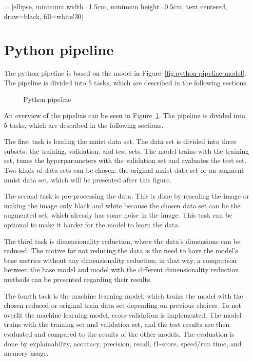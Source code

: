  = [ellipse, minimum width=1.5cm, minimum height=0.5cm, text centered, draw=black, fill=white!30]
\section{Python pipeline}\label{sec:python-pipeline}
The python pipeline is based on the model in Figure~\ref{fig:python-pipeline-model}. The pipeline is divided into 5 tasks, which are described in the following sections. 

\begin{figure}[htb!]
    \centering
    
    \caption{Python pipeline}
    \label{fig:Python-pipeline}
\end{figure}

An overview of the pipeline can be seen in Figure~\ref{fig:Python-pipeline}. The pipeline is divided into 5 tasks, which are described in the following sections. 


The first task is loading the \gls{mnist} data set. The data set is divided into three subsets: the training, validation, and test sets. 
The model trains with the training set, tunes the hyperparameters with the validation set and evaluates the test set. Two kinds of data sets can be chosen: the original \gls{mnist} data set or an augment \gls{mnist} data set, which will be presented after this figure. 

The second task is pre-processing the data. This is done by rescaling the image or making the image only black and white because the chosen data set can be the augmented set, which already has some noise in the image. This task can be optional to make it harder for the model to learn the data.

The third task is dimensionality reduction, where the data's dimensions can be reduced. The motive for not reducing the data is the need to have the model's base metrics without any dimensionality reduction; in that way, a comparison between the base model and model with the different dimensionality reduction methods can be presented regarding their results.

The fourth task is the machine learning model, which trains the model with the chosen reduced or original train data set depending on previous choices. 
To not overfit the machine learning model, cross-validation is implemented.
The model trains with the training set and validation set, and the test results are then evaluated and compared to the results of the other models. The evaluation is done by explainability, accuracy, precision, recall, f1-score, speed/run time, and memory usage.

